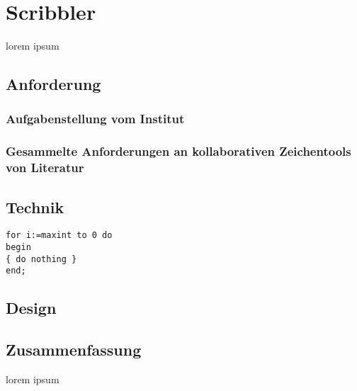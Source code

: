 \chapter{Scribbler}\label{ch:scribbler}

lorem ipsum

\section{Anforderung}

\subsection{Aufgabenstellung vom Institut}

\subsection{Gesammelte Anforderungen an kollaborativen Zeichentools von Literatur}

\section{Technik}

\begin{lstlisting}[float,caption=A scribbler code snippet]
for i:=maxint to 0 do
begin
{ do nothing }
end;
\end{lstlisting}

\section{Design}

\section*{Zusammenfassung}
lorem ipsum